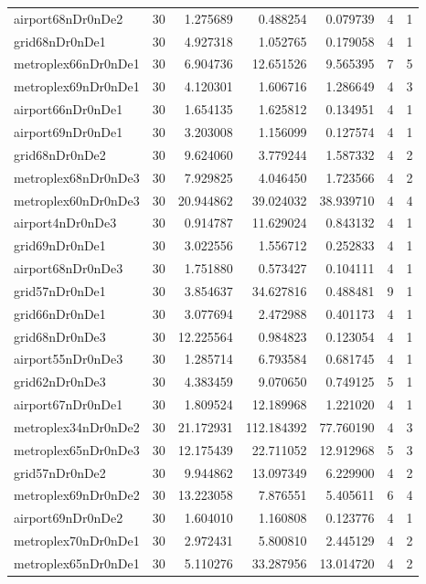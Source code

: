 \documentclass[../../../thesis.tex]{subfiles}
\begin{document}
\begin{longtable}{|l|r|r|r|r|r|r|}
airport68nDr0nDe2 & 30 & 1.275689 & 0.488254 & 0.079739 & 4 & 1 \\
grid68nDr0nDe1 & 30 & 4.927318 & 1.052765 & 0.179058 & 4 & 1 \\
metroplex66nDr0nDe1 & 30 & 6.904736 & 12.651526 & 9.565395 & 7 & 5 \\
metroplex69nDr0nDe1 & 30 & 4.120301 & 1.606716 & 1.286649 & 4 & 3 \\
airport66nDr0nDe1 & 30 & 1.654135 & 1.625812 & 0.134951 & 4 & 1 \\
airport69nDr0nDe1 & 30 & 3.203008 & 1.156099 & 0.127574 & 4 & 1 \\
grid68nDr0nDe2 & 30 & 9.624060 & 3.779244 & 1.587332 & 4 & 2 \\
metroplex68nDr0nDe3 & 30 & 7.929825 & 4.046450 & 1.723566 & 4 & 2 \\
metroplex60nDr0nDe3 & 30 & 20.944862 & 39.024032 & 38.939710 & 4 & 4 \\
airport4nDr0nDe3 & 30 & 0.914787 & 11.629024 & 0.843132 & 4 & 1 \\
grid69nDr0nDe1 & 30 & 3.022556 & 1.556712 & 0.252833 & 4 & 1 \\
airport68nDr0nDe3 & 30 & 1.751880 & 0.573427 & 0.104111 & 4 & 1 \\
grid57nDr0nDe1 & 30 & 3.854637 & 34.627816 & 0.488481 & 9 & 1 \\
grid66nDr0nDe1 & 30 & 3.077694 & 2.472988 & 0.401173 & 4 & 1 \\
grid68nDr0nDe3 & 30 & 12.225564 & 0.984823 & 0.123054 & 4 & 1 \\
airport55nDr0nDe3 & 30 & 1.285714 & 6.793584 & 0.681745 & 4 & 1 \\
grid62nDr0nDe3 & 30 & 4.383459 & 9.070650 & 0.749125 & 5 & 1 \\
airport67nDr0nDe1 & 30 & 1.809524 & 12.189968 & 1.221020 & 4 & 1 \\
metroplex34nDr0nDe2 & 30 & 21.172931 & 112.184392 & 77.760190 & 4 & 3 \\
metroplex65nDr0nDe3 & 30 & 12.175439 & 22.711052 & 12.912968 & 5 & 3 \\
grid57nDr0nDe2 & 30 & 9.944862 & 13.097349 & 6.229900 & 4 & 2 \\
metroplex69nDr0nDe2 & 30 & 13.223058 & 7.876551 & 5.405611 & 6 & 4 \\
airport69nDr0nDe2 & 30 & 1.604010 & 1.160808 & 0.123776 & 4 & 1 \\
metroplex70nDr0nDe1 & 30 & 2.972431 & 5.800810 & 2.445129 & 4 & 2 \\
metroplex65nDr0nDe1 & 30 & 5.110276 & 33.287956 & 13.014720 & 4 & 2 \\

\end{longtable}
\end{document}
